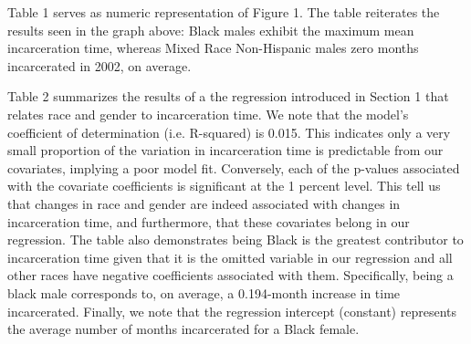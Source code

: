 \documentclass{article}
\begin{document}


Table 1 serves as numeric representation of Figure 1. The table reiterates the results seen in the graph above: Black males exhibit the maximum mean incarceration time, whereas Mixed Race Non-Hispanic males zero months incarcerated in 2002, on average.



Table 2 summarizes the results of a the regression introduced in Section 1 that relates race and gender to incarceration time. We note that the model's coefficient of determination (i.e. R-squared) is 0.015. This indicates only a very small proportion of the variation in incarceration time is predictable from our covariates, implying a poor model fit. Conversely, each of the p-values associated with the covariate coefficients is significant at the 1 percent level. This tell us that changes in race and gender are indeed associated with changes in incarceration time, and furthermore, that these covariates belong in our regression. The table also demonstrates being Black is the greatest contributor to incarceration time given that it is the omitted variable in our regression and all other races have negative coefficients associated with them. Specifically, being a black male corresponds to, on average, a 0.194-month increase in time incarcerated. Finally, we note that the regression intercept (constant) represents the average number of months incarcerated for a Black female.
\end{document}
